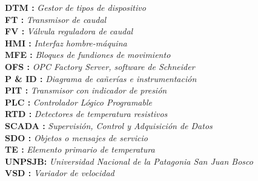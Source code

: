 \noindent %
\textbf{DTM :} \textit{Gestor de tipos de dispositivo}\\
\textbf{FT :} \textit{Transmisor de caudal}\\
\textbf{FV :} \textit{Válvula reguladora de caudal}\\
\textbf{HMI :} \textit{Interfaz hombre-máquina}\\
\textbf{MFE :} \textit{Bloques de fundiones de movimiento}\\
\textbf{OFS :} \textit{OPC Factory Server, software de Schneider}\\
\textbf{P \& ID :} \textit{Diagrama de cañerías e instrumentación}\\
\textbf{PIT :} \textit{Transmisor con indicador de presión}\\
\textbf{PLC :} \textit{Controlador Lógico Programable}\\
\textbf{RTD :} \textit{Detectores de temperatura resistivos}\\
\textbf{SCADA :} \textit{Supervisión, Control y Adquisición de Datos}\\ 
\textbf{SDO :} \textit{Objetos o mensajes de servicio}\\
\textbf{TE :} \textit{Elemento primario de temperatura}\\
\textbf{UNPSJB:} \textit{Universidad Nacional de la Patagonia San Juan Bosco}\\
\textbf{VSD :} \textit{Variador de velocidad}\\

\newpage